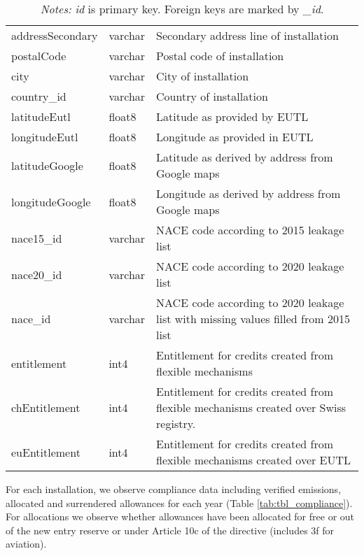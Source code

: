 \documentclass[authoryear]{elsarticle}
\begin{document}
\begin{table}[tbp]
\begin{tabular*}{\textwidth}{@{}@{\extracolsep{\fill}} llp{8cm} @{}}
		addressSecondary & varchar & Secondary address line of installation \\
		postalCode & varchar & Postal code of installation \\
		city  & varchar & City of installation \\
		country\_id & varchar & Country of installation \\
		latitudeEutl & float8 & Latitude as provided by EUTL \\
		longitudeEutl & float8 & Longitude as provided in EUTL \\
		latitudeGoogle & float8 & Latitude as derived by address from Google maps \\
		longitudeGoogle & float8 & Longitude as derived by address from Google maps \\
		nace15\_id & varchar & NACE code according to 2015 leakage list \\
		nace20\_id & varchar & NACE code according to 2020 leakage list \\
		nace\_id & varchar & NACE code according to 2020 leakage list with missing values filled from 2015 list \\
		entitlement & int4  & Entitlement for credits created from flexible mechanisms \\
		chEntitlement & int4  & Entitlement for credits created from flexible mechanisms created over Swiss registry. \\
		euEntitlement & int4  & Entitlement for credits created from flexible mechanisms created over EUTL\\
		\bottomrule
		\bottomrule
	\end{tabular*}%
	\vspace{-3ex}
\caption*{\footnotesize \emph{Notes:} \textit{id} is primary key. Foreign keys are marked by \textit{\_id}.}
\vspace{0ex}
\end{table}

For each installation, we observe compliance data including verified emissions, allocated and surrendered allowances for each year (Table \ref{tab:tbl_compliance}). For allocations we observe whether allowances have been allocated for free or out of the new entry reserve or under Article 10c of the directive (includes 3f for aviation).
\end{document}
